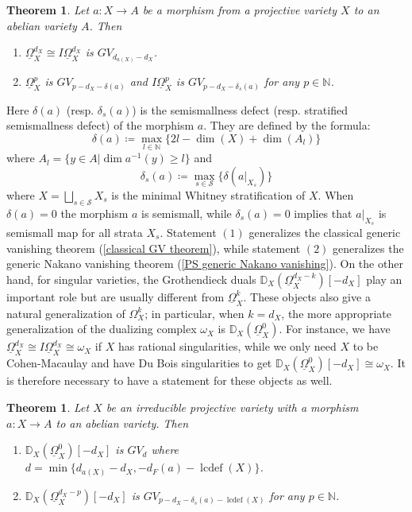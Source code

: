 \documentclass[11pt]{amsart}
\theoremstyle{definition}
\theoremstyle{plain}
\newcommand{\NN}{\mathbb N}
\newcommand{\DD}{\mathbb D}
\newcommand{\sS}{\mathscr S}
\newcommand{\DB}{\underline{\Omega}} %
\DeclareMathOperator{\lcdef}{lcdef}
\newcounter{intro}
\newtheorem{intro-theorem}[intro]{Theorem}
\begin{document}
\medskip

\begin{intro-theorem} \label{theorem: easy GV for DB^p and IC^p}
    Let $a:X\to A$ be a morphism from a projective variety $X$ to an abelian variety $A$. Then
    \begin{enumerate}
        \item $\DB^{d_X}_X \cong I\DB_X^{d_X}$ is $GV_{d_{a(X)}-d_X}$. 
        \item $\DB^{p}_X$ is $GV_{p-d_X -\delta(a)}$ and $I\DB_X^{p}$ is $GV_{p-d_X -\delta_s(a)}$ for any $p\in \NN$.  
    \end{enumerate}
\end{intro-theorem}

Here $\delta(a)$ (resp. $\delta_s(a)$) is the semismallness defect (resp. stratified semismallness defect) of the morphism $a$. They are defined by the formula:
\[\delta(a) \coloneqq \max_{l\in \NN} \{2l-\dim(X) + \dim(A_l)\}\]
where $A_l = \{y\in A | \dim a^{-1}(y)\ge l \}$ and 
\[\delta_s(a) \coloneqq \max_{s\in \sS} \{\delta(a|_{X_s})\}\]
where $X = \bigsqcup_{s\in \sS} X_s$ is the minimal Whitney stratification of $X$. When $\delta(a) =0$ the morphism $a$ is semismall, while $\delta_s(a) = 0$ implies that $a|_{X_s}$ is semismall map for all strata $X_s$. Statement $(1)$ generalizes the classical generic vanishing theorem (\ref{classical GV theorem}), while statement $(2)$ generalizes the generic Nakano vanishing theorem (\ref{PS generic Nakano vanishing}). On the other hand, for singular varieties, the Grothendieck duals $\DD_X(\DB_X^{d_X-k})[-d_X]$ play an important role but are usually different from $\DB^{k}_X$. These objects also give a natural generalization of $\Omega_X^{k}$; in particular, when $k=d_X$, the more appropriate generalization of the dualizing complex $\omega_X$ is $\DD_X(\DB_X^0)$. For instance, we have $\DB_X^{d_X}\cong I\DB_X^{d_X} \cong \omega_X$ if $X$ has rational singularities, while we only need $X$ to be Cohen-Macaulay and have Du Bois singularities to get $\DD_X(\DB^0_X)[-d_X] \cong \omega_X$. It is therefore necessary to have a statement for these objects as well.
    
\begin{intro-theorem} \label{theorem: hard GV for D(DB^p)}
    Let $X$ be an irreducible projective variety with a morphism $a: X \to A$ to an abelian variety. Then 
    \begin{enumerate}
        \item $\DD_X(\DB^0_X)[-d_X]$ is $GV_{d}$ where $d=\min\{d_{a(X)}-d_X, -d_F(a) -\lcdef(X)\}$. 
        \item $\DD_X(\DB_X^{d_X-p})[-d_X]$ is $GV_{p-d_X-\delta_s(a)-\lcdef(X)}$ for any $p\in\NN$.
    \end{enumerate}
\end{intro-theorem}
\end{document}
